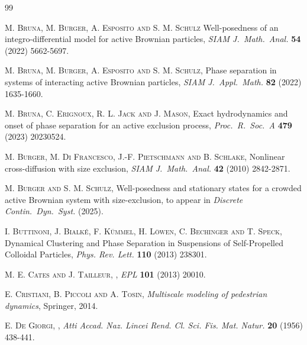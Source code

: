 \documentclass[11pt,a4paper,reqno]{amsart}
\theoremstyle{remark}
\theoremstyle{definition}
\numberwithin{equation}{section}
\begin{document}
\begin{thebibliography}{99}
\begin{footnotesize}
\newblock \textsc{M. Bruna, M. Burger, A. Esposito and S. M. Schulz}
\newblock Well-posedness of an integro-differential model for active Brownian particles, 
\newblock \textit{SIAM J.~Math.~Anal.} \textbf{54} (2022) 5662-5697. 

\newblock \textsc{M. Bruna, M. Burger, A. Esposito and S. M. Schulz},
\newblock Phase separation in systems of interacting active Brownian particles, 
\newblock \textit{SIAM J.~Appl.~Math.} \textbf{82} (2022) 1635-1660. 

\newblock \textsc{M. Bruna, C. Erignoux, R. L. Jack and J. Mason},
\newblock Exact hydrodynamics and onset of phase separation for an active exclusion process, 
\newblock \textit{Proc.~R.~Soc.~A} \textbf{479} (2023) 20230524. 

\newblock \textsc{M. Burger, M. Di Francesco, J.-F. Pietschmann and B. Schlake},
\newblock Nonlinear cross-diffusion with size exclusion, 
\newblock \textit{SIAM J.~Math.~Anal.} \textbf{42} (2010) {2842-2871}. 

    \newblock \textsc{M. Burger and S. M. Schulz}, 
    \newblock Well-posedness and stationary states for a crowded active Brownian system with size-exclusion, 
    \newblock to appear in \textit{Discrete Contin.~Dyn.~Syst.} (2025). 

    \newblock \textsc{I. Buttinoni, J. Bialk\'e, F. K\"ummel, H. L\"owen, C. Bechinger and T. Speck},
    \newblock Dynamical Clustering and Phase Separation in Suspensions of Self-Propelled Colloidal Particles, 
    \newblock \textit{Phys. Rev. Lett.} \textbf{110} (2013) 238301.

  
  



    \newblock \textsc{M. E. Cates and J. Tailleur},
    , 
    \newblock \textit{EPL} \textbf{101} (2013) 20010. 

    \newblock \textsc{E. Cristiani, B. Piccoli and A. Tosin},
    \newblock \textit{Multiscale modeling of pedestrian dynamics}, Springer, 2014.
    

 \newblock \textsc{E. De Giorgi},
 , 
 \newblock \textit{Atti Accad. Naz.
Lincei Rend. Cl. Sci. Fis. Mat. Natur.} \textbf{20} (1956) {438-441}.





\end{footnotesize}
\end{thebibliography}
\end{document}
